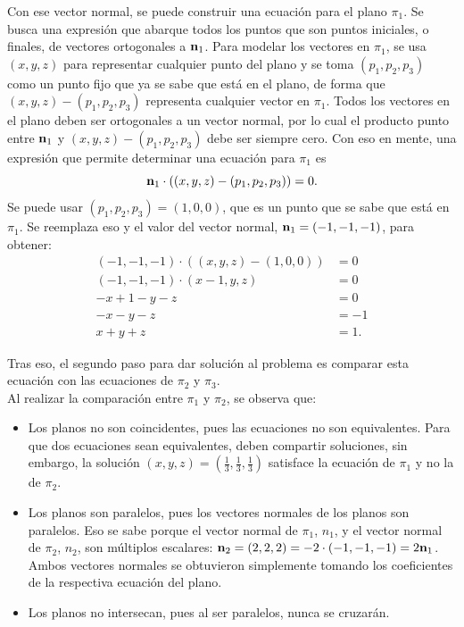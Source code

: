 \documentclass{fmbvecto}
\begin{document}
\begin{problema}
Con ese vector normal, se puede construir una ecuación para el plano \(\pi_1\). Se busca una expresión que abarque todos los puntos que son puntos iniciales, o finales, de vectores ortogonales a \(\boldsymbol{{\mathbf{n}}}_1\). Para modelar los vectores en \(\pi_1\), se usa \((x, y, z)\) para representar cualquier punto del plano y se toma \((p_1, p_2, p_3)\) como un punto fijo que ya se sabe que está en el plano, de forma que \((x, y, z) - (p_1, p_2, p_3)\) representa cualquier vector en \(\pi_1\). Todos los vectores en el plano deben ser ortogonales a un vector normal, por lo cual el producto punto entre \(\boldsymbol{{\mathbf{n}}}_1\) y \((x, y, z) - (p_1, p_2, p_3)\) debe ser siempre cero. Con eso en mente, una expresión que permite determinar una ecuación para \(\pi_1\) es
\begin{equation*}
    \boldsymbol{{\mathbf{n}}}_1 \cdot ((x, y, z) - (p_1, p_2, p_3)) = 0.
\end{equation*}
Se puede usar \((p_1, p_2, p_3) = (1, 0, 0)\), que es un punto que se sabe que está en \(\pi_1\). Se reemplaza eso y el valor del vector normal, \(\boldsymbol{{\mathbf{n}}}_1 = (-1, -1, -1)\), para obtener:
\begin{align*}
    (-1, -1, -1) \cdot ((x, y, z) - (1, 0, 0)) &= 0\\
    (-1, -1, -1) \cdot (x-1, y, z)  &= 0\\
    -x+1 -y -z &= 0\\
    -x -y -z &= -1\\
    x + y + z &= 1.
\end{align*}

Tras eso, el segundo paso para dar solución al problema es comparar esta ecuación con las ecuaciones de \(\pi_2\) y \(\pi_3\). \\

Al realizar la comparación entre \(\pi_1\) y \(\pi_2\), se observa que:
\begin{itemize}
    \item Los planos no son coincidentes, pues las ecuaciones no son equivalentes. Para que dos ecuaciones sean equivalentes, deben compartir soluciones, sin embargo, la solución \((x, y, z) = \left(\frac{1}{3}, \frac{1}{3}, \frac{1}{3}\right)\) satisface la ecuación de \(\pi_1\) y no la de \(\pi_2\).
    \item Los planos son paralelos, pues los vectores normales de los planos son paralelos. Eso se sabe porque el vector normal de \(\pi_1\), \(n_1\), y el vector normal de \(\pi_2\), \(n_2\), son múltiplos escalares: \(\boldsymbol{{\mathbf{n}}}_2 = (2, 2, 2) = -2\cdot (-1, -1, -1) = 2\boldsymbol{{\mathbf{n}}}_1\). Ambos vectores normales se obtuvieron simplemente tomando los coeficientes de la respectiva ecuación del plano. 
    \item Los planos no intersecan, pues al ser paralelos, nunca se cruzarán.\\
\end{itemize}


\end{problema}
\end{document}
